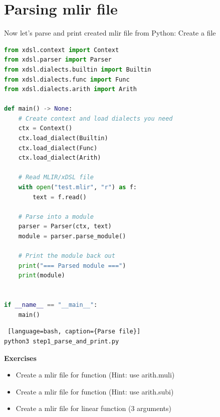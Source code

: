 \documentclass[../main.tex]{subfiles}
\begin{document}
\section{Parsing mlir file}
Now let's parse and print created mlir file from Python:
Create a file 

\begin{lstlisting}[language=Python, caption={step1\_parse\_and\_print.py}]
from xdsl.context import Context
from xdsl.parser import Parser
from xdsl.dialects.builtin import Builtin
from xdsl.dialects.func import Func
from xdsl.dialects.arith import Arith

def main() -> None:
    # Create context and load dialects you need
    ctx = Context()
    ctx.load_dialect(Builtin)
    ctx.load_dialect(Func)
    ctx.load_dialect(Arith)

    # Read MLIR/xDSL file
    with open("test.mlir", "r") as f:
        text = f.read()

    # Parse into a module
    parser = Parser(ctx, text)
    module = parser.parse_module()

    # Print the module back out
    print("=== Parsed module ===")
    print(module)


if __name__ == "__main__":
    main()
\end{lstlisting}

\begin{lstlisting} [language=bash, caption={Parse file}]
python3 step1_parse_and_print.py
\end{lstlisting}

\textbf{Exercises}
\begin{itemize}
    \item Create a mlir file for  function (Hint: use arith.muli)
    \item Create a mlir file for  function (Hint: use arith.subi)
    \item Create a mlir file for linear function  (3 arguments)
\end{itemize}
\end{document}
